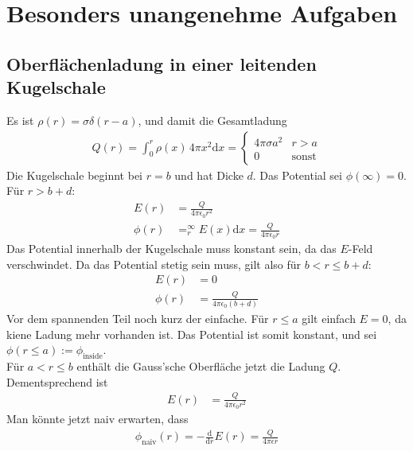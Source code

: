 \documentclass[english, parskip=full]{scrartcl}
\title{\titel}
\date{\today}
\newcommand{\intx}{}
\begin{document}
\maketitle  %

\section{Besonders unangenehme Aufgaben}
\subsection{Oberflächenladung in einer leitenden Kugelschale}
Es ist $\rho(r)=\sigma\delta(r-a)$, und damit die Gesamtladung
\begin{align}
Q(r) = \int_0^r\rho(x) \,4\pi x^2\mathrm{d}x =\begin{cases} 4\pi\sigma a^2 & r > a \\ 0 & \mathrm{sonst}\end{cases}
\end{align}
Die Kugelschale beginnt bei $r=b$ und hat Dicke $d$. 
Das Potential sei $\phi(\infty) = 0$. \\
Für $r > b+d$:
\begin{align}
E(r) &= \frac{Q}{4\pi\epsilon_0 r^2}\\
\phi(r) &= \intx_r^\infty E(x) \mathrm{d}x = \frac{Q}{4\pi\epsilon_0 r}
\end{align}
Das Potential innerhalb der Kugelschale muss konstant sein, da das $E$-Feld verschwindet. Da das Potential stetig sein muss, gilt also für $b<r\le b+d$:
\begin{align}
E(r) &= 0\\
\phi(r) &= \frac{Q}{4\pi\epsilon_0 (b+d)}
\end{align}
Vor dem spannenden Teil noch kurz der einfache.
Für $r\le a$ gilt einfach $E=0$, da kiene Ladung mehr vorhanden ist. Das Potential ist somit konstant, und sei $\phi(r\le a):=\phi_\mathrm{inside}$.\\
Für $a<r\le b$ enthält die Gauss'sche Oberfläche jetzt die Ladung $Q$.
Dementsprechend ist 
\begin{align}
E(r) &= \frac{Q}{4\pi\epsilon_0 r^2}
\end{align}
Man könnte jetzt naiv erwarten, dass 
\begin{align}
\phi_\mathrm{naiv}(r) = -\frac{\mathrm{d}}{\mathrm{d}r}E(r)=\frac{Q}{4\pi\epsilon r}
\end{align}
\end{document}

